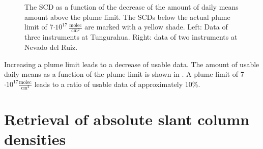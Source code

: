 \begin{figure}
	\centering
	\caption[The  SCD  as a function of the decrease of the amount of daily means amount above the plume limit. Data of Tungurahua and Nevado del Ruiz.]{The  SCD  as a function of the decrease of the amount of daily means amount above the plume limit. The  SCDs below the actual plume limit of 7$\cdot10^{17}\,\frac{\text{molec}}{\text{cm}^2}$ are marked with a yellow shade. Left: Data of three instruments at Tungurahua. Right: data of two instruments at Nevado del Ruiz.}
	\label{fig:percentageminso2}
\end{figure}
Increasing a plume limit leads to a decrease of usable data. The amount of usable  daily means as a function of the plume limit is shown in . A plume limit of 7$\cdot10^{17}\frac{\text{molec}}{\text{cm}^2}$ leads to a ratio of usable data of approximately 10\%.


\section{Retrieval of absolute slant column densities\label{Chap:Cont}}

